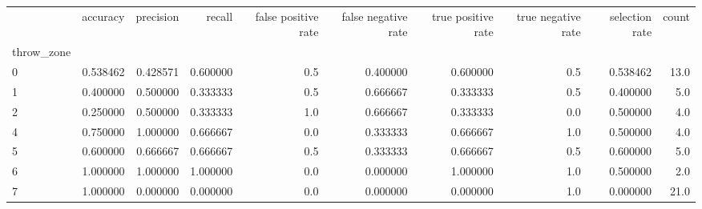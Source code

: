 \begin{tabular}{lrrrrrrrrr}
\toprule
{} &  accuracy &  precision &    recall &  false positive rate &  false negative rate &  true positive rate &  true negative rate &  selection rate &  count \\
throw\_zone &           &            &           &                      &                      &                     &                     &                 &        \\
\midrule
0          &  0.538462 &   0.428571 &  0.600000 &                  0.5 &             0.400000 &            0.600000 &                 0.5 &        0.538462 &   13.0 \\
1          &  0.400000 &   0.500000 &  0.333333 &                  0.5 &             0.666667 &            0.333333 &                 0.5 &        0.400000 &    5.0 \\
2          &  0.250000 &   0.500000 &  0.333333 &                  1.0 &             0.666667 &            0.333333 &                 0.0 &        0.500000 &    4.0 \\
4          &  0.750000 &   1.000000 &  0.666667 &                  0.0 &             0.333333 &            0.666667 &                 1.0 &        0.500000 &    4.0 \\
5          &  0.600000 &   0.666667 &  0.666667 &                  0.5 &             0.333333 &            0.666667 &                 0.5 &        0.600000 &    5.0 \\
6          &  1.000000 &   1.000000 &  1.000000 &                  0.0 &             0.000000 &            1.000000 &                 1.0 &        0.500000 &    2.0 \\
7          &  1.000000 &   0.000000 &  0.000000 &                  0.0 &             0.000000 &            0.000000 &                 1.0 &        0.000000 &   21.0 \\
\bottomrule
\end{tabular}
